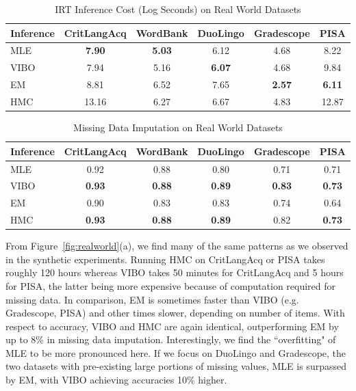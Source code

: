 \begin{table}
    \centering
    \caption{IRT Inference Cost (Log Seconds) on Real World Datasets}
    \label{table:realworld:cost}
    \small
    \begin{tabular}{lccccc}
    \hline
    Inference & CritLangAcq & WordBank & DuoLingo & Gradescope & PISA \\
    \hline
    MLE & \textbf{7.90} & \textbf{5.03} & 6.12 & 4.68 & 8.22 \\
    VIBO & 7.94 & 5.16 & \textbf{6.07} & 4.68 & 9.84 \\  
    EM & 8.81 & 6.52 & 7.65 & \textbf{2.57} & \textbf{6.11} \\
    HMC & 13.16 & 6.27 & 6.67 & 4.83 & 12.87 \\
    \hline
    \end{tabular}
\end{table}

\begin{table}
    \centering
    \caption{Missing Data Imputation on Real World Datasets}
    \label{table:realworld:acc}
    \small
    \begin{tabular}{lccccc}
    \hline
    Inference & CritLangAcq & WordBank & DuoLingo & Gradescope & PISA \\
    \hline
    MLE & 0.92 & 0.88 & 0.80 & 0.71 & 0.71 \\ 
    VIBO & \textbf{0.93} & \textbf{0.88} & \textbf{0.89} & \textbf{0.83} & \textbf{0.73} \\
    EM & 0.90 & 0.83 & 0.83 & 0.74 & 0.64 \\
    HMC & \textbf{0.93} & \textbf{0.88} & \textbf{0.89} & 0.82 & \textbf{0.73} \\
    \hline
    \end{tabular}
\end{table}

From Figure~\ref{fig:realworld}(a), we find many of the same patterns as we observed in the synthetic experiments.
Running HMC on CritLangAcq or PISA takes roughly 120 hours whereas VIBO takes 50 minutes for CritLangAcq and 5 hours for PISA, the latter being more expensive because of computation required for missing data.
In comparison, EM is sometimes faster than VIBO (e.g. Gradescope, PISA) and other times slower, depending on number of items.
With respect to accuracy, VIBO and HMC are again identical, outperforming EM by up to 8\% in missing data imputation.
Interestingly, we find the ``overfitting" of MLE to be more pronounced here.
If we focus on DuoLingo and Gradescope, the two datasets with pre-existing large portions of missing values, MLE is surpassed by EM, with VIBO achieving accuracies 10\% higher.

